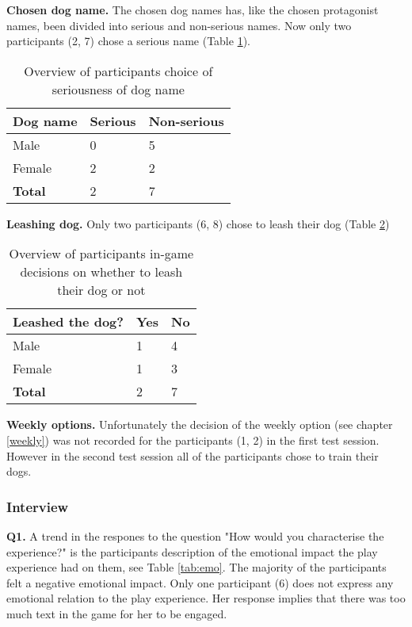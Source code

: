\textbf{Chosen dog name.} The chosen dog names has, like the chosen protagonist names, been divided into serious and non-serious names. Now only two participants (2, 7) chose a serious name (Table \ref{tab:dame}). 

\begin{table}[h]
\centering
\begin{tabular}{l l l}
\hline
\textbf{Dog name} & Serious & Non-serious \\
\hline
Male & 0 & 5 \\
Female & 2 & 2 \\
\textbf{Total} & 2 & 7 \\
\hline
\end{tabular}
\caption{\label{tab:dame}Overview of participants choice of seriousness of dog name}
\end{table}


\textbf{Leashing dog.} Only two participants (6, 8) chose to leash their dog (Table \ref{tab:leas})

\begin{table}[h]
\centering
\begin{tabular}{l l l}
\hline
\textbf{Leashed the dog?} & Yes & No \\
\hline
Male & 1 & 4 \\
Female & 1 & 3 \\
\textbf{Total} & 2 & 7 \\
\hline
\end{tabular}
\caption{\label{tab:leas}Overview of participants in-game decisions on whether to leash their dog or not}
\end{table}


\textbf{Weekly options.} Unfortunately the decision of the weekly option (see chapter \ref{weekly}) was not recorded for the participants (1, 2) in the first test session. However in the second test session all of the participants chose to train their dogs.


\subsubsection{Interview}
\textbf{Q1.} A trend in the respones to the question "How would you characterise the experience?" is the participants description of the emotional impact the play experience had on them, see Table \ref{tab:emo}. The majority of the participants felt a negative emotional impact. Only one participant (6) does not express any emotional relation to the play experience. Her response implies that there was too much text in the game for her to be engaged.

